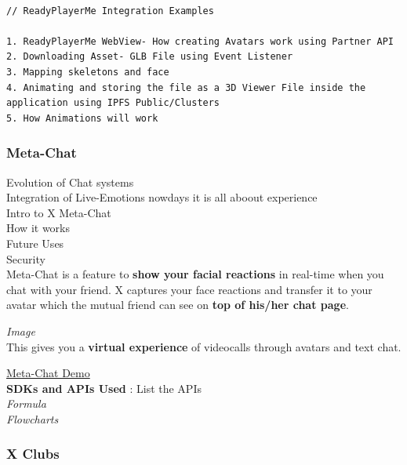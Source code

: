 \documentclass[letterpaper,11pt]{article}
\begin{document}
\begin{lstlisting}[language=Solidity]

// ReadyPlayerMe Integration Examples

1. ReadyPlayerMe WebView- How creating Avatars work using Partner API
2. Downloading Asset- GLB File using Event Listener
3. Mapping skeletons and face
4. Animating and storing the file as a 3D Viewer File inside the application using IPFS Public/Clusters
5. How Animations will work

\end{lstlisting}

\subsubsection{\textbf{Meta-Chat}}

Evolution of Chat systems\\

Integration of Live-Emotions nowdays it is all aboout experience\\

Intro to X Meta-Chat\\

How it works\\

Future Uses\\

Security\\

Meta-Chat is a feature to \textbf{show your facial reactions} in real-time when you chat with your friend. X captures your face reactions and transfer it to your avatar which the mutual friend can see on \textbf{top of his/her chat page}.

\textit{Image}\\

This gives you a \textbf{virtual experience} of videocalls through avatars and text chat.

\hyperlink{https://sample.com}{Meta-Chat Demo}\\

\textbf{SDKs and APIs Used} : List the APIs\\

\textit{Formula\\
Flowcharts}

\subsubsection{\textbf{X Clubs}}
\end{document}
